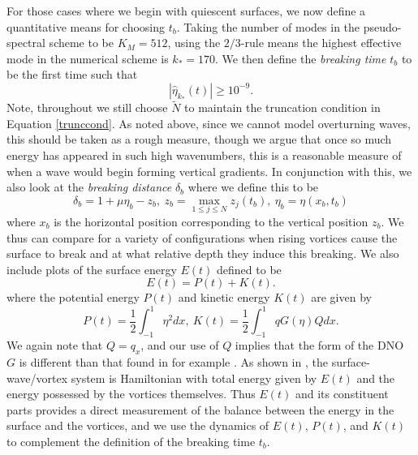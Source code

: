 \documentclass[a4paper,11pt]{article}
\begin{document}
For those cases where we begin with quiescent surfaces, we now define a quantitative means for choosing $t_{b}$. Taking the number of modes in the pseudo-spectral scheme to be $K_{M}=512$, using the $2/3$-rule means the highest effective mode in the numerical scheme is $k_{\ast}=170$.  We then define the {\it breaking time} $t_{b}$ to be the first time such that
\[
\left|\hat{\eta}_{k_{\ast}}(t)\right| \geq 10^{-9}.  
\]
Note, throughout we still choose $\tilde{N}$ to maintain the truncation condition in Equation \eqref{trunccond}.  As noted above, since we cannot model overturning waves, this should be taken as a rough measure, though we argue that once so much energy has appeared in such high wavenumbers, this is a reasonable measure of when a wave would begin forming vertical gradients.  In conjunction with this, we also look at the {\it breaking distance} $\delta_{b}$ where we define this to be 
\[
\delta_{b} = 1 + \mu\eta_{b} - z_{b}, ~ z_{b} = \max_{1\leq j \leq N} z_{j}(t_{b}), ~ \eta_{b} = \eta(x_{b},t_{b})
\]
where $x_{b}$ is the horizontal position corresponding to the vertical position $z_{b}$.  We thus can compare for a variety of configurations when rising vortices cause the surface to break and at what relative depth they induce this breaking.  We also include plots of the surface energy $E(t)$ defined to be 
\[
E(t) = P(t) + K(t).
\] 
where the potential energy $P(t)$ and kinetic energy $K(t)$ are given by 
\[
P(t) =  \frac{1}{2}\int_{-1}^{1}\eta^{2}dx, ~ K(t) = \frac{1}{2}\int_{-1}^{1} q G(\eta)Q dx.
\]
We again note that $Q = q_{x}$, and our use of $Q$ implies that the form of the DNO $G$ is different than that found in for example \cite{craig}.  As shown in \cite{rouhi}, the surface-wave/vortex system is Hamiltonian with total energy given by $E(t)$ and the energy possessed by the vortices themselves.  Thus $E(t)$ and its constituent parts provides a direct measurement of the balance between the energy in the surface and the vortices, and we use the dynamics of $E(t)$, $P(t)$, and $K(t)$ to complement the definition of the breaking time $t_{b}$.   

\end{document}
